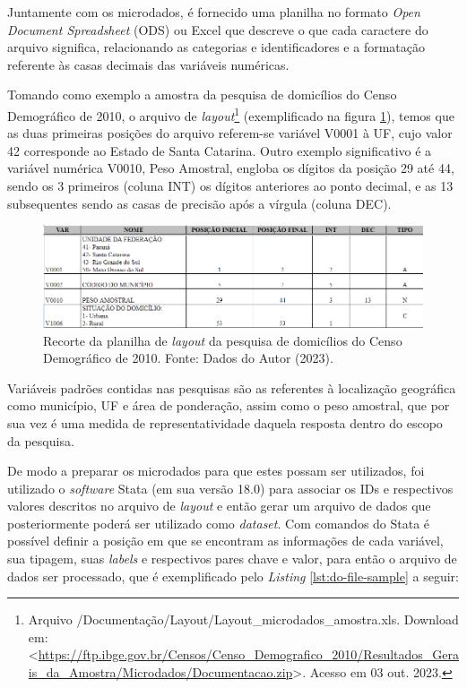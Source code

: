     Juntamente com os microdados, é fornecido uma planilha no formato \textit{Open Document Spreadsheet} (ODS) ou Excel que descreve o que cada caractere do arquivo significa, relacionando as categorias e identificadores e a formatação referente às casas decimais das variáveis numéricas. 
    
    Tomando como exemplo a amostra da pesquisa de domicílios do Censo Demográfico de 2010, o arquivo de \textit{layout}\footnote{\label{fn-layout-domi}Arquivo /Documentação/Layout/Layout\_microdados\_amostra.xls. Download em: <\url{https://ftp.ibge.gov.br/Censos/Censo_Demografico_2010/Resultados_Gerais_da_Amostra/Microdados/Documentacao.zip}>. Acesso em 03 out. 2023.} (exemplificado na figura \ref{fig:layout-domi}), temos que as duas primeiras posições do arquivo referem-se variável V0001 à UF, cujo valor 42 corresponde ao Estado de Santa Catarina. Outro exemplo significativo é a variável numérica V0010, Peso Amostral, engloba os dígitos da posição 29 até 44, sendo os 3 primeiros (coluna INT) os dígitos anteriores ao ponto decimal, e as 13 subsequentes sendo as casas de precisão após a vírgula (coluna DEC).

\begin{figure}[h]
    \centering
    \includegraphics[width=\textwidth]{files/img/layout amostra domicilios 2010.png}
    \caption{Recorte da planilha de \textit{layout} da pesquisa de domicílios do Censo Demográfico de 2010. Fonte: Dados do Autor (2023).}
    \label{fig:layout-domi}
\end{figure}

    Variáveis padrões contidas nas pesquisas são as referentes à localização geográfica como município, UF e área de ponderação, assim como o peso amostral, que por sua vez é uma medida de representatividade daquela resposta dentro do escopo da pesquisa.

    De modo a preparar os microdados para que estes possam ser utilizados, foi utilizado o \textit{software} Stata (em sua versão 18.0) para associar os IDs e respectivos valores descritos no arquivo de \textit{layout} e então gerar um arquivo de dados que posteriormente poderá ser utilizado como \textit{dataset}. 
    Com comandos do Stata é possível definir a posição em que se encontram as informações de cada variável, sua tipagem, suas \textit{labels} e respectivos pares chave e valor, para então o arquivo de dados ser processado, que é exemplificado pelo \textit{Listing} \ref{lst:do-file-sample} a seguir:

